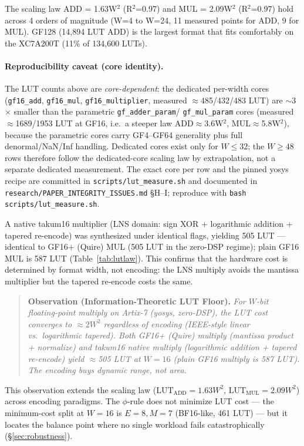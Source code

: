 \documentclass[11pt]{article}
\begin{document}
The scaling law ADD = 1.63W$^2$ (R$^2$=0.97) and MUL = 2.09W$^2$ (R$^2$=0.97)
hold across 4 orders of magnitude (W=4 to W=24, 11 measured points for ADD,
9 for MUL). GF128 (14,894 LUT ADD) is the largest format that fits comfortably on
the XC7A200T (11\% of 134,600 LUTs).

\paragraph{Reproducibility caveat (core identity).} The LUT counts above are
\emph{core-dependent}: the dedicated per-width cores (\texttt{gf16\_add},
\texttt{gf16\_mul}, \texttt{gf16\_multiplier}, measured $\approx$485/432/483 LUT)
are $\sim$3$\times$ smaller than the parametric \texttt{gf\_adder\_param}/
\texttt{gf\_mul\_param} cores (measured $\approx$1689/1953 LUT at GF16, i.e.\ a
steeper law ADD$\approx$3.6W$^2$, MUL$\approx$5.8W$^2$), because the parametric
cores carry GF4--GF64 generality plus full denormal/NaN/Inf handling. Dedicated
cores exist only for $W{\le}32$; the $W{\ge}48$ rows therefore follow the
dedicated-core scaling law by extrapolation, not a separate dedicated measurement.
The exact core per row and the pinned yosys recipe are committed in
\texttt{scripts/lut\_measure.sh} and documented in
\texttt{research/PAPER\_INTEGRITY\_ISSUES.md} \S H--I; reproduce with
\texttt{bash scripts/lut\_measure.sh}.

A native takum16 multiplier (LNS domain: sign XOR + logarithmic addition +
tapered re-encode) was synthesized under identical flags, yielding 505 LUT ---
identical to GF16+ (Quire) MUL (505 LUT in the zero-DSP regime); plain GF16 MUL
is 587 LUT (Table~\ref{tab:lutlaw}). This confirms that the
hardware cost is determined by format width, not encoding: the LNS multiply
avoids the mantissa multiplier but the tapered re-encode costs the same.

\begin{quote}
\textbf{Observation (Information-Theoretic LUT Floor).}
\emph{For $W$-bit floating-point multiply on Artix-7 (yosys, zero-DSP),
the LUT cost converges to $\approx 2W^2$ regardless of encoding
(IEEE-style linear vs.\ logarithmic tapered).  Both GF16+ (Quire) multiply
(mantissa product + normalize) and takum16 native multiply (logarithmic
addition + tapered re-encode) yield $\approx$505 LUT at $W=16$ (plain GF16
multiply is 587 LUT).  The
encoding buys dynamic range, not area.}
\end{quote}

This observation extends the scaling law ($\text{LUT}_{\text{ADD}} = 1.63W^2$,
$\text{LUT}_{\text{MUL}} = 2.09W^2$) across encoding paradigms. The $\phi$-rule
does not minimize LUT cost --- the minimum-cost split at $W=16$ is $E=8, M=7$
(BF16-like, 461 LUT) --- but it locates the balance point where no single
workload fails catastrophically (\S\ref{sec:robustness}).
\end{document}

